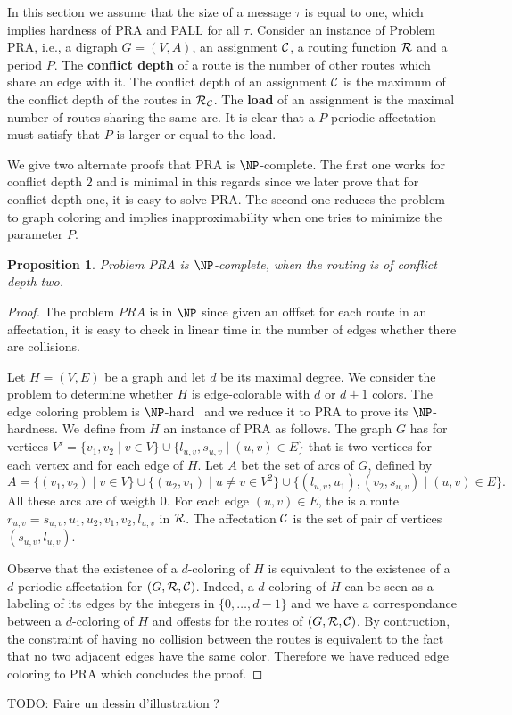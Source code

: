\documentclass[a4paper,10pt]{article}
\newtheorem{proposition}{Proposition}
\newcommand{\todo}[1]{{\color{red} TODO: {#1}}}
\begin{document}
 In this section we assume that the size of a message $\tau$ is equal to one, which implies hardness of PRA and PALL for all $\tau$. 
Consider an instance of Problem PRA, i.e., a digraph $G=(V,A)$, an assignment $\cal C$, a routing function $\cal R$ and a period $P$. 
The {\bf conflict depth} of a route is the number of other routes which share an edge with it. 
The conflict depth of an assignment $\cal C$ is the maximum of the conflict depth of the routes in ${\cal R}_{\cal C}$.
The {\bf load} of an assignment is the maximal number of routes sharing the same arc.
It is clear that a $P$-periodic affectation must satisfy that $P$ is larger or equal to the load.

We give two alternate proofs that PRA is $\NP$-complete.
The first one works for conflict depth $2$ and is minimal in this regards since we later prove that for conflict depth one,
it is easy to solve PRA. The second one reduces the problem to graph coloring and implies inapproximability when one tries to minimize the parameter $P$. \\
 

 

 \begin{proposition}
Problem PRA is $\NP$-complete, when the routing is of conflict depth two.
\end{proposition}
 \begin{proof}
 The problem $PRA$ is in $\NP$ since given an offfset for each route in an affectation, it is easy to check in linear time in the number of edges whether there are collisions.
 
  Let $H=(V,E)$ be a graph and let $d$ be its maximal degree. We consider the problem to determine whether $H$ is edge-colorable
  with $d$ or $d+1$ colors. The edge coloring problem is $\NP$-hard~\cite{holyer1981np} and we reduce it to PRA to prove its $\NP$-hardness. We define from $H$ an instance of PRA as follows. The graph $G$ has for vertices $V'= \{ v_1, v_2 \mid v \in V  \} \cup \{ l_{u,v}, s_{u,v} \mid (u,v) \in E \}$ that is two vertices for each vertex and for each edge of $H$. 
  Let $A$ bet the set of arcs of $G$, defined by 
  $$A = \{(v_1,v_2) \mid v\in V\} \cup \{(u_2,v_1)\mid u \neq v \in V^2\} \cup \{(l_{u,v},u_1),(v_2,s_{u,v}) \mid (u,v) \in E \}. $$
  All these arcs are of weigth $0$. 
  For each edge $(u,v) \in E$, the is a route $r_{u,v} = s_{u,v},u_1,u_2,v_1,v_2,l_{u,v}$ in ${\cal R}$.  
  The affectation ${\cal C}$ is the set of pair of vertices $(s_{u,v}, l_{u,v})$.
    
  Observe that the existence of a $d$-coloring of $H$ is equivalent to the existence of a $d$-periodic affectation
  for $(G,{\cal R},{\cal C})$. Indeed, a $d$-coloring of $H$ can be seen as a labeling of its edges by the integers
  in $\{0,\dots,d-1\}$ and we have a correspondance between a $d$-coloring of $H$ and offests for the routes of $(G,{\cal R},{\cal C})$.
  By contruction, the constraint of having no collision between the routes is equivalent to the fact that no two adjacent edges have
  the same color. Therefore we have reduced edge coloring to PRA which concludes the proof. 
 \end{proof}
 \todo{Faire un dessin d'illustration ?}
 
\end{document}
